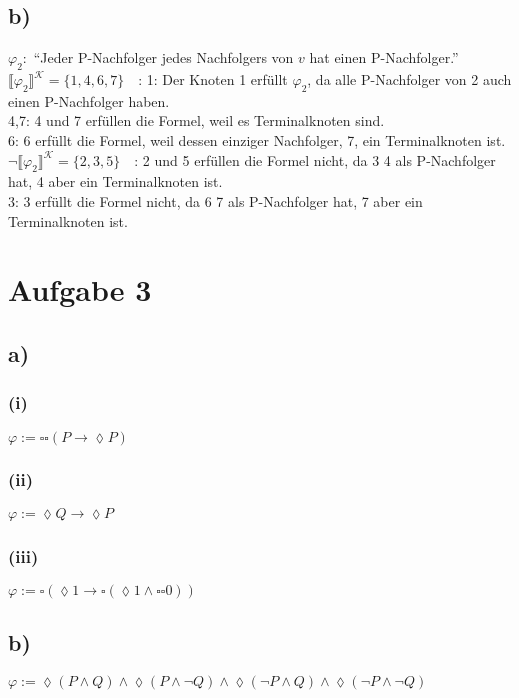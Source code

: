 \documentclass[11pt, a4paper]{article}
\newcommand{\n}{\wedge}
\begin{document}
\subsection*{b)}
$\varphi_2: $ ``Jeder P-Nachfolger jedes Nachfolgers von $v$ hat einen P-Nachfolger.''\\
$\llbracket \varphi_2 \rrbracket^{\mathcal{K}} = \{1, 4, 6, 7\}\quad$: 1: Der Knoten 1 erfüllt $\varphi_2$, da alle P-Nachfolger von 2 auch einen P-Nachfolger haben.\\
4,7: 4 und 7 erfüllen die Formel, weil es Terminalknoten sind.\\
6: 6 erfüllt die Formel, weil dessen einziger Nachfolger, 7, ein Terminalknoten ist.\\


$\neg\llbracket \varphi_2 \rrbracket^{\mathcal{K}} = \{2, 3, 5\}\quad$: 2 und 5 erfüllen die Formel nicht, da 3 4 als P-Nachfolger hat, 4 aber ein Terminalknoten ist.\\
3: 3 erfüllt die Formel nicht, da 6 7 als P-Nachfolger hat, 7 aber ein Terminalknoten ist.

\section*{Aufgabe 3}

\subsection*{a)}
\subsubsection*{(i)}
$\varphi := \square \square (P \rightarrow \lozenge P)$

\subsubsection*{(ii)}
$\varphi := \lozenge Q \rightarrow \lozenge P$

\subsubsection*{(iii)}
$\varphi := \square (\lozenge 1 \rightarrow \square ( \lozenge 1 \n \square \square 0))$

\subsection*{b)}
$\varphi := \lozenge (P \n Q) \n \lozenge(P \n \neg Q) \n \lozenge(\neg P \n Q) \n \lozenge(\neg P \n \neg Q)$
\end{document}

